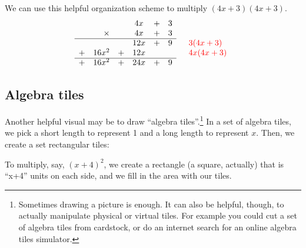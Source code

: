 We can use this helpful organization scheme to multiply $(4x+3)(4x+3)$.
\[\begin{array}{rccccl}
		&	& 4x & + & 3&\\
\times	&	& 4x & + & 3&\\
\cline{1-5}
&&12x&+&9&\quad{\color{red}3(4x+3)}\\
+\quad16x^2&+& 12x&&&\quad{\color{red}4x(4x+3)}\\
\cline{1-5}
+\quad16x^2&+& 24x&+&9&\\
\end{array}\]

\subsection{Algebra tiles}

Another helpful visual may be to draw ``algebra tiles''.\footnote{Sometimes drawing a picture is enough. It can also be helpful, though, to actually manipulate physical or virtual tiles. For example you could cut a set of algebra tiles from cardstock, or do an internet search for an online algebra tiles simulator.} In a set of algebra tiles, we pick a short length to represent 1 and a long length to represent $x$. Then, we create a set rectangular tiles:

\begin{center}
\end{center}

To multiply, say, $(x+4)^2$, we create a rectangle (a square, actually) that is ``x+4'' units on each side, and we fill in the area with our tiles.

